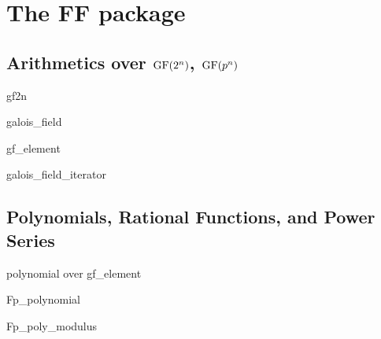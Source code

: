 %
%
%
%

\part*{The \LiDIA FF package}\label{LiDIA-FF}


\chapter{Arithmetics over $\mathrm{GF}(2^n)$, $\mathrm{GF}(p^n)$}

\begin{class}{gf2n}
  
\end{class}

\begin{class}{galois_field}
  
\end{class}

\begin{class}{gf_element}
  
\end{class}

\begin{class}{galois_field_iterator}
  
\end{class}


\chapter{Polynomials, Rational Functions, and Power Series}

\begin{class}{polynomial over gf_element}
  
\end{class}

\begin{class}{Fp_polynomial}
  
\end{class}

\begin{class}{Fp_poly_modulus}
  
\end{class}

